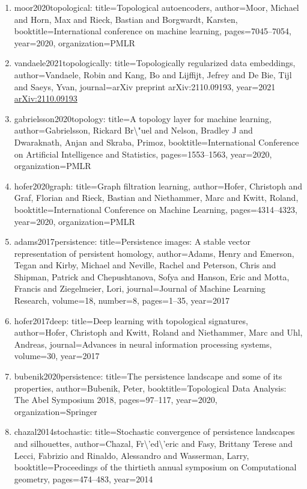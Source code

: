 \documentclass[11pt]{article}
\begin{document}
\begin{enumerate}[leftmargin=*]
  \item moor2020topological: title=Topological autoencoders, author=Moor, Michael and Horn, Max and Rieck, Bastian and Borgwardt, Karsten, booktitle=International conference on machine learning, pages=7045--7054, year=2020, organization=PMLR
  \item vandaele2021topologically: title=Topologically regularized data embeddings, author=Vandaele, Robin and Kang, Bo and Lijffijt, Jefrey and De Bie, Tijl and Saeys, Yvan, journal=arXiv preprint arXiv:2110.09193, year=2021 \href{https://arxiv.org/abs/2110.09193}{arXiv:2110.09193}
  \item gabrielsson2020topology: title=A topology layer for machine learning, author=Gabrielsson, Rickard Br\textbackslash{}"uel and Nelson, Bradley J and Dwaraknath, Anjan and Skraba, Primoz, booktitle=International Conference on Artificial Intelligence and Statistics, pages=1553--1563, year=2020, organization=PMLR
  \item hofer2020graph: title=Graph filtration learning, author=Hofer, Christoph and Graf, Florian and Rieck, Bastian and Niethammer, Marc and Kwitt, Roland, booktitle=International Conference on Machine Learning, pages=4314--4323, year=2020, organization=PMLR
  \item adams2017persistence: title=Persistence images: A stable vector representation of persistent homology, author=Adams, Henry and Emerson, Tegan and Kirby, Michael and Neville, Rachel and Peterson, Chris and Shipman, Patrick and Chepushtanova, Sofya and Hanson, Eric and Motta, Francis and Ziegelmeier, Lori, journal=Journal of Machine Learning Research, volume=18, number=8, pages=1--35, year=2017
  \item hofer2017deep: title=Deep learning with topological signatures, author=Hofer, Christoph and Kwitt, Roland and Niethammer, Marc and Uhl, Andreas, journal=Advances in neural information processing systems, volume=30, year=2017
  \item bubenik2020persistence: title=The persistence landscape and some of its properties, author=Bubenik, Peter, booktitle=Topological Data Analysis: The Abel Symposium 2018, pages=97--117, year=2020, organization=Springer
  \item chazal2014stochastic: title=Stochastic convergence of persistence landscapes and silhouettes, author=Chazal, Fr\textbackslash{}'ed\textbackslash{}'eric and Fasy, Brittany Terese and Lecci, Fabrizio and Rinaldo, Alessandro and Wasserman, Larry, booktitle=Proceedings of the thirtieth annual symposium on Computational geometry, pages=474--483, year=2014

\end{enumerate}
\end{document}
